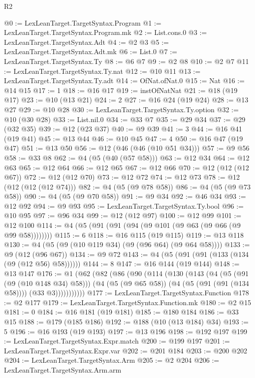 \begin{lexlean}{R2}
\begin{coremodule}
@0 := LexLeanTarget.TargetSyntax.Program
@1 := LexLeanTarget.TargetSyntax.Program.mk
@2 := List.cons.{0}
@3 := LexLeanTarget.TargetSyntax.Adt
@4 := @2 @3
@5 := LexLeanTarget.TargetSyntax.Adt.mk
@6 := List.{0}
@7 := LexLeanTarget.TargetSyntax.Ty
@8 := @6 @7
@9 := @2 @8
@10 := @2 @7
@11 := LexLeanTarget.TargetSyntax.Ty.nat
@12 := @10 @11
@13 := LexLeanTarget.TargetSyntax.Ty.adt
@14 := OfNat.ofNat.{0}
@15 := Nat
@16 := @14 @15
@17 := 1
@18 := @16 @17
@19 := instOfNatNat
@21 := @18 (@19 @17)
@23 := @10 (@13 @21)
@24 := 2
@27 := @16 @24 (@19 @24)
@28 := @13 @27
@29 := @10 @28
@30 := LexLeanTarget.TargetSyntax.Ty.option
@32 := @10 (@30 @28)
@33 := List.nil.{0}
@34 := @33 @7
@35 := @29 @34
@37 := @29 (@32 @35)
@39 := @12 (@23 @37)
@40 := @9 @39
@41 := 3
@44 := @16 @41 (@19 @41)
@45 := @13 @44
@46 := @10 @45
@47 := 4
@50 := @16 @47 (@19 @47)
@51 := @13 @50
@56 := @12 (@46 (@46 (@10 @51 @34)))
@57 := @9 @56
@58 := @33 @8
@62 := @4 (@5 (@40 (@57 @58)))
@63 := @12 @34
@64 := @12 @63
@65 := @12 @64
@66 := @12 @65
@67 := @12 @66
@70 := @12 (@12 (@12 @67))
@72 := @12 (@12 @70)
@73 := @12 @72
@74 := @12 @73
@78 := @12 (@12 (@12 (@12 @74)))
@82 := @4 (@5 (@9 @78 @58))
@86 := @4 (@5 (@9 @73 @58))
@90 := @4 (@5 (@9 @70 @58))
@91 := @9 @34
@92 := @46 @34
@93 := @12 @92
@94 := @9 @93
@95 := LexLeanTarget.TargetSyntax.Ty.bool
@96 := @10 @95
@97 := @96 @34
@99 := @12 (@12 @97)
@100 := @12 @99
@101 := @12 @100
@114 := @4 (@5 (@91 (@91 (@94 (@9 @101 (@9 @63 (@9 @66 (@9 @99 @58))))))))
@115 := 6
@118 := @16 @115 (@19 @115)
@119 := @13 @118
@130 := @4 (@5 (@9 (@10 @119 @34) (@9 (@96 @64) (@9 @64 @58))))
@133 := @9 (@12 (@96 @67))
@134 := @9 @72
@143 := @4 (@5 (@91 (@91 (@133 (@134 (@9 (@12 @56) @58))))))
@144 := 8
@147 := @16 @144 (@19 @144)
@148 := @13 @147
@176 := @1
    (@62
      (@82
        (@86
          (@90
            (@114
              (@130
                (@143
                  (@4
                    (@5 (@91 (@9 (@10 @148 @34) @58)))
                    (@4 (@5 (@9 @65 @58)) (@4 (@5 (@91 (@91 (@134 @58)))) (@33 @3)))))))))))
@177 := LexLeanTarget.TargetSyntax.Function
@178 := @2 @177
@179 := LexLeanTarget.TargetSyntax.Function.mk
@180 := @2 @15
@181 := 0
@184 := @16 @181 (@19 @181)
@185 := @180 @184
@186 := @33 @15
@188 := @179 (@185 @186)
@192 := @188 (@10 (@13 @184) @34)
@193 := 5
@196 := @16 @193 (@19 @193)
@197 := @13 @196
@198 := @192 @197
@199 := LexLeanTarget.TargetSyntax.Expr.match
@200 := @199 @197
@201 := LexLeanTarget.TargetSyntax.Expr.var
@202 := @201 @184
@203 := @200 @202
@204 := LexLeanTarget.TargetSyntax.Arm
@205 := @2 @204
@206 := LexLeanTarget.TargetSyntax.Arm.arm

\end{coremodule}
\end{lexlean}
